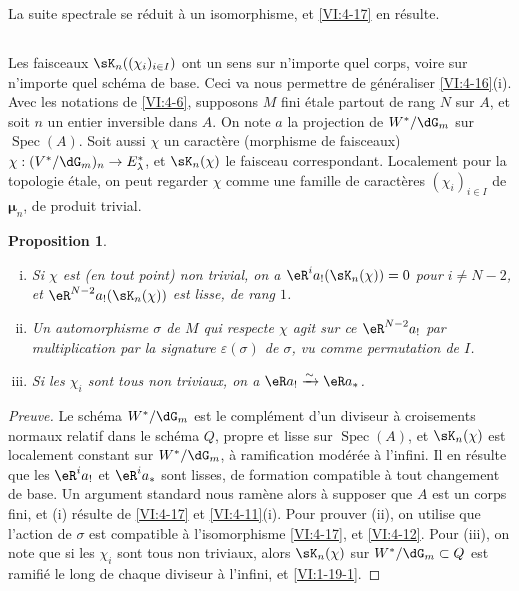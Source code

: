 \documentclass[oneside]{book}
\DeclareMathOperator{\spec}{Spec}
\newcommand{\dmu}{{\bm\mu}}
\newcommand{\iso}{\xrightarrow\sim}
\theoremstyle{sga-source}
\theoremstyle{sga-source-dash}
\theoremstyle{sga-source-dotdash}
\theoremstyle{sga-source-number-note-dash}
\theoremstyle{sga-source-note-number-dotdash}
\theoremstyle{sga-source-example-dotdash}
\theoremstyle{sga-source-inline-number}
\theoremstyle{sga-source-bare-number}
\theoremstyle{sga-source}
\newtheorem{proposition_}[subsection]{Proposition}
\newcommand{\PrintPage}[1]{}\newcommand{\MathPage}[1]{}\newcommand{\PrintCite}[2]{#1}\newcommand{\var}[3]{#2}
\begin{document}
La suite spectrale se réduit à un isomorphisme, et \ref{VI:4-17} en 
résulte. 





\subsection{}\label{VI:4-19}

Les faisceaux $\sK_n((\chi_i)_{i\in I})$ ont un sens sur n'importe quel corps, 
voire sur n'importe quel schéma de base. Ceci va nous permettre de généraliser 
\ref{VI:4-16}(i). Avec les notations de \ref{VI:4-6}, supposons $M$ fini 
étale partout de rang $N$ sur $A$, et soit $n$ un entier inversible dans $A$. 
On note $a$ la projection de $W^\ast/\dG_m$ sur $\spec(A)$. Soit aussi $\chi$ 
un caractère (morphisme de faisceaux) 
$\chi:(V^\ast/\dG_m)_n \to E_\lambda^\ast$, et $\sK_n(\chi)$ le faisceau 
correspondant. Localement pour la topologie étale, on peut regarder $\chi$ 
comme une famille de caractères $(\chi_i)_{i\in I}$ de $\dmu_n$, de produit 
trivial. 





\begin{proposition_}\label{VI:4-20}
\begin{enumerate}[(i)]
  \item Si $\chi$ est (en tout point) non trivial, on a 
    $\eR^i a_! (\sK_n(\chi)) = 0$ pour $i\ne \var{N-1}{N-2}{S45-SOL-0856}$, et 
    $\eR^{\var{N-1}{N-2}{S45-SOL-0856}} a_!(\sK_n(\chi))$ est lisse, de rang $1$. 
  \item Un automorphisme $\sigma$ de $M$ qui respecte $\chi$ agit sur ce 
    $\eR^{\var{N-1}{N-2}{S45-SOL-0856}} a_!$ par multiplication par la signature $\varepsilon(\sigma)$ 
    de $\sigma$, vu comme permutation de $I$. 
  \item Si les $\chi_i$ sont tous non triviaux, on a $\eR a_! \iso \eR a_\ast$. 
\end{enumerate}
\end{proposition_}
\begin{proof}[Preuve]
Le schéma $W^\ast/\dG_m$ est le complément d'un diviseur à croisements 
normaux relatif dans le schéma $Q$, propre et lisse sur $\spec(A)$, et 
$\sK_n(\chi)$ est \PrintPage{207}
localement constant sur $W^\ast/\dG_m$, à ramification 
\var{modérée a l'infini}{modérée à l'infini}{S45-SOL-0858}. Il en résulte que les $\eR^i a_!$ et 
$\eR^i a_\ast$ sont lisses, de formation compatible à tout changement de 
base. Un argument standard nous ramène alors à supposer que $A$ est un 
corps fini, et (i) résulte de \ref{VI:4-17} et \ref{VI:4-11}(i). Pour 
prouver (ii), on utilise que l'action de $\sigma$ est compatible à 
l'isomorphisme \ref{VI:4-17}, et \ref{VI:4-12}. Pour (iii), on note que si les 
$\chi_i$ sont tous non triviaux, alors $\sK_n(\chi)$ sur 
$W^\ast/\dG_m\subset Q$ est ramifié le long de chaque diviseur à l'infini, 
et \ref{VI:1-19-1}. 
\end{proof}
\end{document}
